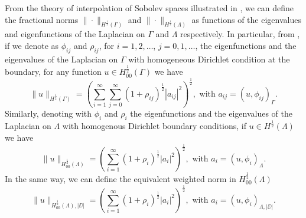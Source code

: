 \documentclass[r]{siamart171218}
\begin{document}
From the theory of interpolation of Sobolev spaces  illustrated in \cite{chandler2015interpolation}, we can define the fractional norms $\|\cdot \|_{H^{\frac 12}(\Gamma)}$ and $\|\cdot \|_{H^{\frac 12}(\Lambda)}$ as functions of the eigenvalues and eigenfunctions of the Laplacian on $\Gamma$ and $\Lambda$ respectively. In particular, from \cite[Lemma 4.11]{chandler2015interpolation}, if we denote as $\phi _{ij}$ and $\rho _{ij}$, for $i=1,2,\dots$, $j=0,1,\dots$, the eigenfunctions and the eigenvalues of the Laplacian on $\Gamma$ with homogeneous Dirichlet condition at the boundary, for any function $u \in H^{\frac 12}_{00}(\Gamma)$ we have
\begin{equation}\label{eq:fracnorm_gamma}
\|u\|_{H^{\frac 12}(\Gamma)}=\left(\sum_{i=1}^{\infty}\sum_{j=0}^{\infty} \left( 1+ \rho_{ij}\right)^{\frac 12}|a_{ij}|^2\right)^{\frac 12},
\text{ with }
a_{ij}=\left( u,\phi _{ij} \right)_{\Gamma}.
\end{equation}
Similarly, denoting with $\phi _i$ and $\rho _i$ the eigenfunctions and the eigenvalues of the Laplacian on $\Lambda$ with homogenous Dirichlet boundary conditions, if $u \in H^{\frac 12}(\Lambda)$ we have
\begin{equation}\label{eq:fracnorm_lambda}
\|u\|_{H^{\frac 12}_{00}(\Lambda)}=\left(\sum_{i=1}^{\infty} \left( 1+ \rho_{i}\right)^{\frac 12}|a_i|^2\right)^{\frac 12},
\text{ with }
a_i=\left(u, \phi _i \right)_{\Lambda}.
\end{equation}
In the same way, we can define the equivalent weighted norm in $H^{\frac 12}_{00}(\Lambda)$
\begin{equation}\label{eq:weightfracnorm}
\|u\|_{H^{\frac 12}_{00}(\Lambda), |\DD|}=\left(\sum_{i=1}^{\infty} \left( 1+ \rho_{i}\right)^{\frac 12}|a_i|^2\right)^{\frac 12},
\text{ with }
a_i=\left(u, \phi _i \right)_{\Lambda, |\DD|}.
\end{equation}
\end{document}
